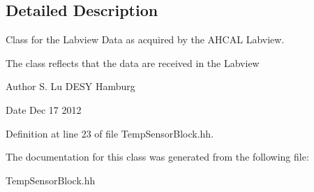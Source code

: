 \subsection{Detailed Description}
Class for the Labview Data as acquired by the A\-H\-C\-A\-L Labview. 

The class reflects that the data are received in the Labview \begin{DoxyAuthor}{Author}
S. Lu D\-E\-S\-Y Hamburg 
\end{DoxyAuthor}
\begin{DoxyDate}{Date}
Dec 17 2012 
\end{DoxyDate}


Definition at line 23 of file Temp\-Sensor\-Block.\-hh.



The documentation for this class was generated from the following file\-:\begin{DoxyCompactItemize}
\item 
Temp\-Sensor\-Block.\-hh\end{DoxyCompactItemize}

